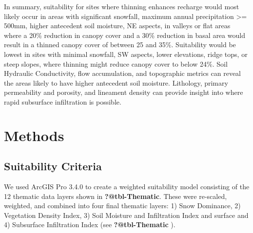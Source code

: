 \documentclass[
  number,
  preprint,
  3p,
  onecolumn]{elsarticle}
\begin{document}
In summary, suitability for sites where thinning enhances recharge would
most likely occur in areas with significant snowfall, maximum annual
precipitation \textgreater= 500mm, higher antecedent soil moisture, NE
aspects, in valleys or flat areas where a 20\% reduction in canopy cover
and a 30\% reduction in basal area would result in a thinned canopy
cover of between 25 and 35\%. Suitability would be lowest in sites with
minimal snowfall, SW aspects, lower elevations, ridge tops, or steep
slopes, where thinning might reduce canopy cover to below 24\%. Soil
Hydraulic Conductivity, flow accumulation, and topographic metrics can
reveal the areas likely to have higher antecedent soil moisture.
Lithology, primary permeability and porosity, and lineament density can
provide insight into where rapid subsurface infiltration is possible.

\section{Methods}\label{methods}

\subsection{Suitability Criteria}\label{suitability-criteria}

We used ArcGIS Pro 3.4.0 to create a weighted suitability model
consisting of the 12 thematic data layers shown in
\textbf{?@tbl-Thematic}. These were re-scaled, weighted, and combined
into four final thematic layers: 1) Snow Dominance, 2) Vegetation
Density Index, 3) Soil Moisture and Infiltration Index and surface and
4) Subsurface Infiltration Index (see \textbf{?@tbl-Thematic} ).
\end{document}
